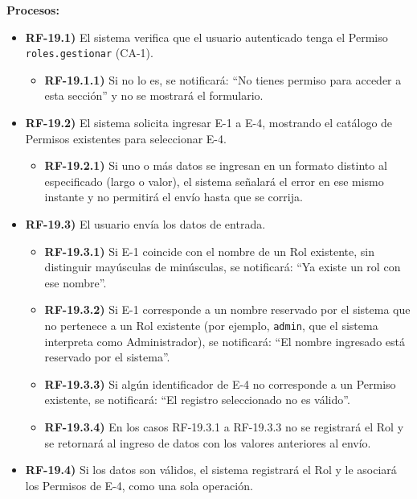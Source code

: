 \textbf{Procesos:}
\begin{itemize}[label={}, leftmargin=1.5em]
  \item \textbf{RF-19.1)} El sistema verifica que el usuario autenticado tenga el Permiso \texttt{roles.gestionar} (CA-1).
  \begin{itemize}[label={}, leftmargin=1.5em]
    \item \textbf{RF-19.1.1)} Si no lo es, se notificar\'a: ``No tienes permiso para acceder a esta secci\'on'' y no se mostrar\'a el formulario.
  \end{itemize}
  \item \textbf{RF-19.2)} El sistema solicita ingresar E-1 a E-4, mostrando el cat\'alogo de Permisos existentes para seleccionar E-4.
  \begin{itemize}[label={}, leftmargin=1.5em]
    \item \textbf{RF-19.2.1)} Si uno o m\'as datos se ingresan en un formato distinto al especificado (largo o valor), el sistema se\~nalar\'a el error en ese mismo instante y no permitir\'a el env\'io hasta que se corrija.
  \end{itemize}
  \item \textbf{RF-19.3)} El usuario env\'ia los datos de entrada.
  \begin{itemize}[label={}, leftmargin=1.5em]
    \item \textbf{RF-19.3.1)} Si E-1 coincide con el nombre de un Rol existente, sin distinguir may\'usculas de min\'usculas, se notificar\'a: ``Ya existe un rol con ese nombre''.
    \item \textbf{RF-19.3.2)} Si E-1 corresponde a un nombre reservado por el sistema que no pertenece a un Rol existente (por ejemplo, \texttt{admin}, que el sistema interpreta como Administrador), se notificar\'a: ``El nombre ingresado est\'a reservado por el sistema''.
    \item \textbf{RF-19.3.3)} Si alg\'un identificador de E-4 no corresponde a un Permiso existente, se notificar\'a: ``El registro seleccionado no es v\'alido''.
    \item \textbf{RF-19.3.4)} En los casos RF-19.3.1 a RF-19.3.3 no se registrar\'a el Rol y se retornar\'a al ingreso de datos con los valores anteriores al env\'io.
  \end{itemize}
  \item \textbf{RF-19.4)} Si los datos son v\'alidos, el sistema registrar\'a el Rol y le asociar\'a los Permisos de E-4, como una sola operaci\'on.
  \begin{itemize}[label={}, leftmargin=1.5em]

\end{itemize}
\end{itemize}
